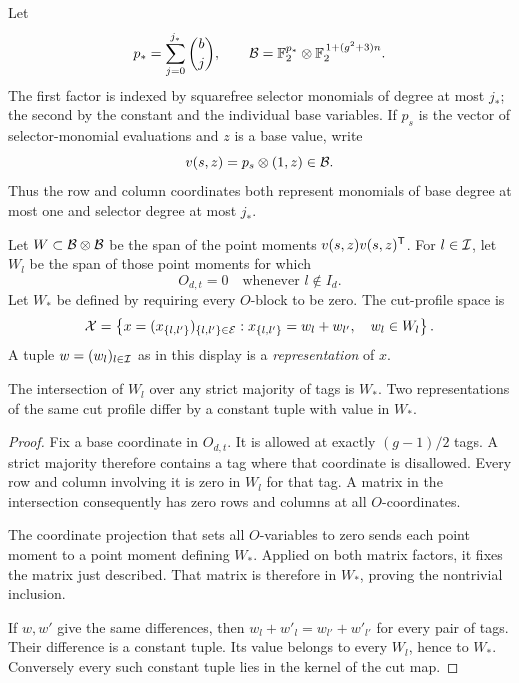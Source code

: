 Let
\[
 p_*=\sum_{j=0}^{j_*}\binom bj,\qquad
 \mathcal B=\mathbb F_2^{p_*}\otimes\mathbb F_2^{\,1+(g^2+3)n}.
\]
The first factor is indexed by squarefree selector monomials of degree at most \(j_*\); the second by the constant and the individual base variables.
If \(p_s\) is the vector of selector-monomial evaluations and \(z\) is a base value, write
\begin{equation}\label{eq:point-evaluation}
 v(s,z)=p_s\otimes(1,z)\in\mathcal B.
\end{equation}
Thus the row and column coordinates both represent monomials of base degree at most one and selector degree at most \(j_*\).

Let \(W\subset\mathcal B\otimes\mathcal B\) be the span of the point moments \(v(s,z)v(s,z)^{\mathsf T}\).
For \(l\in\mathcal I\), let \(W_l\) be the span of those point moments for which
\[
 O_{d,t}=0\quad\text{whenever }l\notin I_d.
\]
Let \(W_*\) be defined by requiring every \(O\)-block to be zero.
The cut-profile space is
\begin{equation}\label{eq:cut-profile-space}
 \mathcal X=
 \left\{x=(x_{\{l,l'\}})_{\{l,l'\}\in\mathcal E}:
 x_{\{l,l'\}}=w_l+w_{l'},\quad w_l\in W_l\right\}.
\end{equation}
A tuple \(w=(w_l)_{l\in\mathcal I}\) as in this display is a \emph{representation} of \(x\).

\begin{lemma}\label{lem:cut-kernel}
The intersection of \(W_l\) over any strict majority of tags is \(W_*\).
Two representations of the same cut profile differ by a constant tuple with value in \(W_*\).
\end{lemma}
\begin{proof}
Fix a base coordinate in \(O_{d,t}\).  It is allowed at exactly \((g-1)/2\) tags.
A strict majority therefore contains a tag where that coordinate is disallowed.
Every row and column involving it is zero in \(W_l\) for that tag.
A matrix in the intersection consequently has zero rows and columns at all \(O\)-coordinates.

The coordinate projection that sets all \(O\)-variables to zero sends each point moment to a point moment defining \(W_*\).
Applied on both matrix factors, it fixes the matrix just described.
That matrix is therefore in \(W_*\), proving the nontrivial inclusion.

If \(w,w'\) give the same differences, then
\(w_l+w'_l=w_{l'}+w'_{l'}\) for every pair of tags.
Their difference is a constant tuple.  Its value belongs to every \(W_l\), hence to \(W_*\).
Conversely every such constant tuple lies in the kernel of the cut map.
\end{proof}

